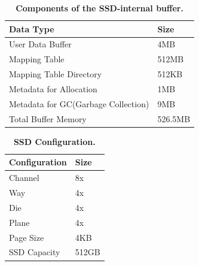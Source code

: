 \begin{table}[tb]
    \centering
    \fontsize{11}{11}
    \small
    \begin{tabular}{|p{5cm}|l|}
		\hline
        \bf{Data Type} &  \bf{Size} \\ \hline \hline
	    {User Data Buffer} & {4MB} \\ \hline
		{Mapping Table} & {512MB} \\ \hline
		{Mapping Table Directory} & {512KB} \\ \hline 
		{Metadata for Allocation} & {1MB} \\ \hline 
		{Metadata for GC(Garbage Collection)} & {9MB}  \\ \hline 
		{Total Buffer Memory} & {526.5MB} \\ \hline
    \end{tabular}
    \caption{\textbf{Components of the SSD-internal buffer.}}
    \label{tab:ssd_buff_comp}
    \vspace{-10pt}
\end{table}



\begin{table}[tb]
    \centering
    \fontsize{11}{11}
    \small
    \begin{tabular}{|p{5cm}|l|}
		\hline
		\bf{Configuration} & \bf{Size} \\ \hline \hline
        Channel & 8x \\ \hline
        Way & 4x \\ \hline
        Die & 4x \\ \hline
        Plane & 4x \\ \hline
        Page Size & 4KB \\ \hline
        SSD Capacity & 512GB \\ \hline
    \end{tabular}
    \caption{\textbf{SSD Configuration.}}
    \label{tab:ssd_config}
\end{table}
